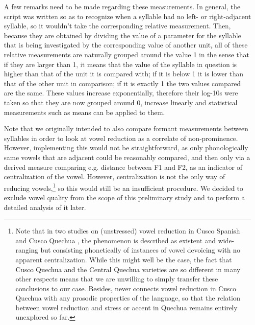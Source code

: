 \documentclass[output=paper]{LSP/langsci}
\begin{document}
A few remarks need to be made regarding these measurements. In general, the script was written so as to recognize when a syllable had no left- or right-adjacent syllable, so it wouldn’t take the corresponding relative measurement. Then, because they are obtained by dividing the value of a parameter for the syllable that is being investigated by the corresponding value of another unit, all of these relative measurements are naturally grouped around the value 1 in the sense that if they are larger than 1, it means that the value of the syllable in question is higher than that of the unit it is compared with; if it is below 1 it is lower than that of the other unit in comparison; if it is exactly 1 the two values compared are the same. These values increase exponentially, therefore their log-10s were taken so that they are now grouped around 0, increase linearly and statistical measurements such as means can be applied to them. 

Note that we originally intended to also compare formant measurements between syllables in order to look at vowel reduction as a correlate of non-pro\-mi\-nence. However, implementing this would not be straightforward, as only phonologically same vowels that are adjacent could be reasonably compared, and then only via a derived measure comparing e.g. distance between F1 and F2, as an indicator of centralization of the vowel. However, centralization is not the only way of reducing vowels,\footnote{Note that in two studies on (unstressed) vowel reduction in Cusco Spanish \citep{Delforge2008} and Cusco Quechua \citep{Delforge2011}, the phenomenon is described as existent and wide-ranging but consisting phonetically of instances of vowel devoicing with no apparent centralization. While this might well be the case, the fact that Cusco Quechua and the Central Quechua varieties are so different in many other respects means that we are unwilling to simply transfer these conclusions to our case. Besides, \citet{Delforge2011} never connects vowel reduction in Cusco Quechua with any prosodic properties of the language, so that the relation between vowel reduction and stress or accent in Quechua remains entirely unexplored so far.} so this would still be an insufficient procedure. We decided to exclude vowel quality from the scope of this preliminary study and to perform a detailed analysis of it later. 
\end{document}
